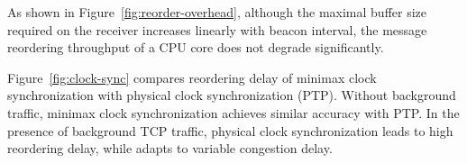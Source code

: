 As shown in Figure~\ref{fig:reorder-overhead}, although the maximal buffer size required on the receiver increases linearly with beacon interval, the message reordering throughput of a CPU core does not degrade significantly.

Figure~\ref{fig:clock-sync} compares reordering delay of minimax clock synchronization with physical clock synchronization (PTP). Without background traffic, minimax clock synchronization achieves similar accuracy with PTP. In the presence of background TCP traffic, physical clock synchronization leads to high reordering delay, while \sys adapts to variable congestion delay.

